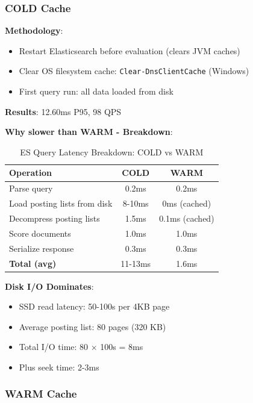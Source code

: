 \documentclass[12pt,a4paper]{article}
\begin{document}
\subsubsection{COLD Cache}

\textbf{Methodology}:
\begin{itemize}
    \item Restart Elasticsearch before evaluation (clears JVM caches)
    \item Clear OS filesystem cache: \texttt{Clear-DnsClientCache} (Windows)
    \item First query run: all data loaded from disk
\end{itemize}

\textbf{Results}: 12.60ms P95, 98 QPS

\textbf{Why slower than WARM - Breakdown}:

\begin{table}[H]
\centering
\small
\begin{tabular}{lcc}
\toprule
\textbf{Operation} & \textbf{COLD} & \textbf{WARM} \\
\midrule
Parse query & 0.2ms & 0.2ms \\
Load posting lists from disk & 8-10ms & 0ms (cached) \\
Decompress posting lists & 1.5ms & 0.1ms (cached) \\
Score documents & 1.0ms & 1.0ms \\
Serialize response & 0.3ms & 0.3ms \\
\midrule
\textbf{Total (avg)} & 11-13ms & 1.6ms \\
\bottomrule
\end{tabular}
\caption{ES Query Latency Breakdown: COLD vs WARM}
\end{table}

\textbf{Disk I/O Dominates}:
\begin{itemize}
    \item SSD read latency: 50-100\textmu s per 4KB page
    \item Average posting list: 80 pages (320 KB)
    \item Total I/O time: 80 $\times$ 100\textmu s = 8ms
    \item Plus seek time: 2-3ms
\end{itemize}

\subsubsection{WARM Cache}
\end{document}
